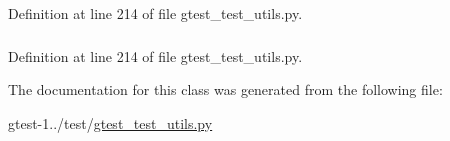 \-Definition at line 214 of file gtest\-\_\-test\-\_\-utils.\-py.

\hypertarget{classgtest__test__utils_1_1Subprocess_aaafeb0a064cb5b92ad449517611ca978}{
\subsubsection[{terminated\-\_\-by\-\_\-signal}]{}}\label{d0/d1b/classgtest__test__utils_1_1Subprocess_aaafeb0a064cb5b92ad449517611ca978}


\-Definition at line 214 of file gtest\-\_\-test\-\_\-utils.\-py.



\-The documentation for this class was generated from the following file\-:\begin{DoxyCompactItemize}
\item 
gtest-\/1../test/\hyperlink{gtest__test__utils_8py}{gtest\-\_\-test\-\_\-utils.\-py}\end{DoxyCompactItemize}
